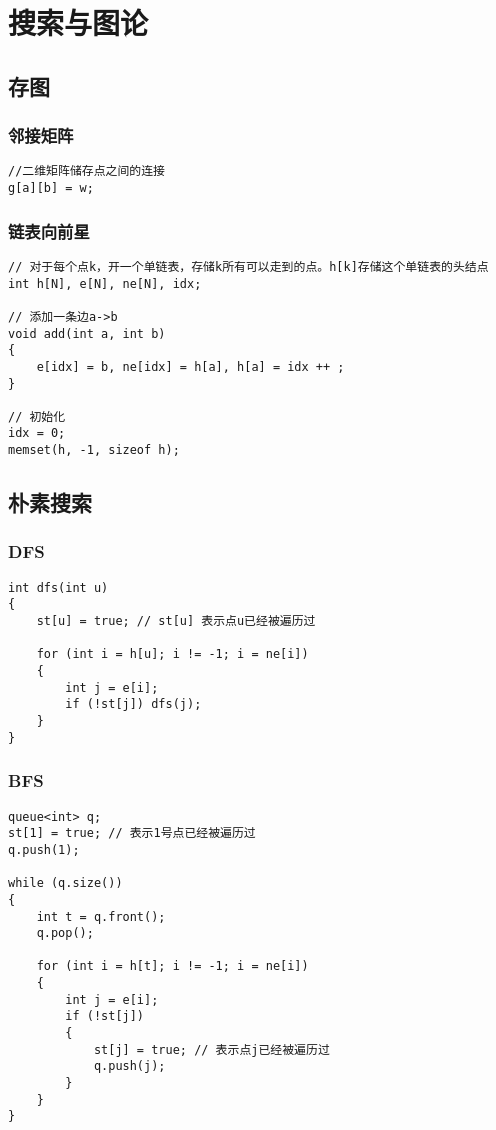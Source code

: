 \documentclass[12pt,a4paper,UTF16]{ctexbook}
\theoremstyle{plain}
\begin{document}
\chapter{搜索与图论}
\section{存图}
\subsection{邻接矩阵}
\begin{lstlisting}
//二维矩阵储存点之间的连接
g[a][b] = w;
\end{lstlisting}
\subsection{链表向前星}
\begin{lstlisting}
// 对于每个点k，开一个单链表，存储k所有可以走到的点。h[k]存储这个单链表的头结点
int h[N], e[N], ne[N], idx;

// 添加一条边a->b
void add(int a, int b)
{
    e[idx] = b, ne[idx] = h[a], h[a] = idx ++ ;
}

// 初始化
idx = 0;
memset(h, -1, sizeof h);
\end{lstlisting}
\newpage
\section{朴素搜索}
\subsection{DFS}
\begin{lstlisting}
int dfs(int u)
{
    st[u] = true; // st[u] 表示点u已经被遍历过

    for (int i = h[u]; i != -1; i = ne[i])
    {
        int j = e[i];
        if (!st[j]) dfs(j);
    }
}
\end{lstlisting}
\subsection{BFS}
\begin{lstlisting}
queue<int> q;
st[1] = true; // 表示1号点已经被遍历过
q.push(1);

while (q.size())
{
    int t = q.front();
    q.pop();

    for (int i = h[t]; i != -1; i = ne[i])
    {
        int j = e[i];
        if (!st[j])
        {
            st[j] = true; // 表示点j已经被遍历过
            q.push(j);
        }
    }
}
\end{lstlisting}
\end{document}
